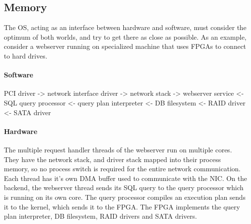 \documentclass[a4paper]{article}
\begin{document}
\begin{itemize}
\begin{itemize}
\section{Memory}

The OS, acting as an interface between hardware and software, must consider the optimum of both worlds, and try to get there as close as possible. As an example, consider a webserver running on specialized machine that uses FPGAs to connect to hard drives.

\paragraph{Software}
PCI driver -> network interface driver -> network stack -> webserver service <- SQL query processor <- query plan interpreter <- DB filesystem <- RAID driver <- SATA driver

\paragraph{Hardware}
The multiple request handler threads of the webserver run on multiple cores. They have the network stack, and driver stack mapped into their process memory, so no process switch is required for the entire network communication. Each thread has it's own DMA buffer used to communicate with the NIC. On the backend, the webserver thread sends its SQL query to the query processor which is running on its own core. The query processor compiles an execution plan sends it to the kernel, which sends it to the FPGA. The FPGA implements the query plan interpreter, DB filesystem, RAID drivers and SATA drivers.


\end{itemize}
\end{itemize}
\end{document}

